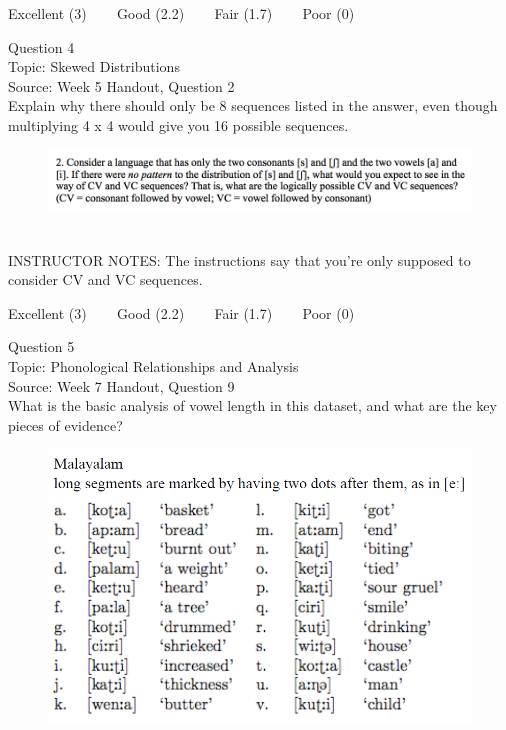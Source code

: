 \documentclass[12pt]{article}
\begin{document}
\vfill
Excellent (3) ~~~ Good (2.2) ~~~ Fair (1.7) ~~~ Poor (0)
\newpage

{\large Question 4}\\

Topic: Skewed Distributions\\
Source: Week 5 Handout, Question 2\\

Explain why there should only be 8 sequences listed in the answer, even though multiplying 4 x 4 would give you 16 possible sequences.\\

\begin{figure}[H]
\includegraphics{../images/skew2.png}
\end{figure}

~\\
INSTRUCTOR NOTES: The instructions say that you're only supposed to consider CV and VC sequences. 


\vfill
Excellent (3) ~~~ Good (2.2) ~~~ Fair (1.7) ~~~ Poor (0)
\newpage

{\large Question 5}\\

Topic: Phonological Relationships and Analysis\\
Source: Week 7 Handout, Question 9\\

What is the basic analysis of vowel length in this dataset, and what are the key pieces of evidence?\\

\begin{figure}[H]
\includegraphics{../images/malayalam.png}
\end{figure}
\end{document}
